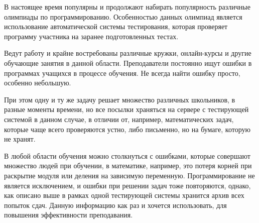 \documentclass[specification,annotation]{itmo-student-thesis}
\begin{document}


\researchfunding{}

\researchpublications{
}



\tableofcontents

\startprefacepage

В настоящее время популярны и продолжают набирать популярность различные олимпиады по программированию.
Особенностью данных олимпиад является использование автоматической системы тестирования, которая проверяет
программу участника на заранее подготовленных тестах.

Ведут работу и крайне востребованы различные кружки, онлайн-курсы и другие обучающие занятия в данной области.
Преподаватели постоянно ищут ошибки в программах учащихся в процессе обучения. Не всегда найти ошибку просто, 
особенно небольшую. 

При этом одну и ту же задачу решает множество различных школьников, в разные моменты времени, но все посылки
храняться на сервере с тестирующей системой в данном случае, в отличии от, например, математических задач,
которые чаще всего проверяются устно, либо письменно, но на бумаге, которую не хранят.

В любой области обучения можно столкнуться с ошибками, которые совершают множество людей при обучении,
в математике, например, это потеря корней при раскрытие модуля или деления на зависимую переменную.
Программирование не является исключением, и ошибки при решении задач тоже повторяются, однако, как описано выше
в рамках одной тестирующей системы хранится архив всех попыток сдач. 
Данную информацию как раз и хочется использовать, для повышения эффективности преподавания.
\end{document}
